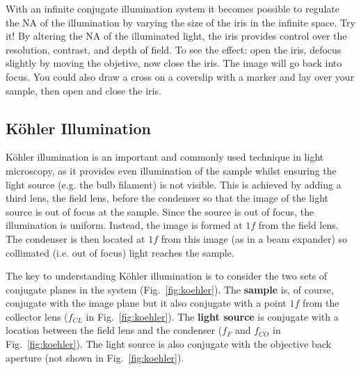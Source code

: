 \documentclass[a4paper]{report}
\begin{document}
With an infinite conjugate illumination system it becomes possible to regulate the NA of the illumination by varying the size of the iris in the infinite space. 
Try it!
By altering the NA of the illuminated light, the iris provides control over the resolution, contrast, and depth of field.
To see the effect: open the iris, defocus slightly by moving the objetive, now close the iris. The image will go back into focus. 
You could also draw a cross on a coverslip with a marker and lay over your sample, then open and close the iris.
%



\clearpage

\subsection{K\"{o}hler Illumination}
K\"{o}hler illumination is an important and commonly used technique in light microscopy, as it provides even illumination of the sample whilst ensuring the light source (e.g. the bulb filament) is not visible. 
This is achieved by adding a third lens, the field lens, before the condenser so that the image of the light source is out of focus at the sample. 
Since the source is out of focus, the illumination is uniform. 
Instead, the image is formed at $1f$ from the field lens. 
The condenser is then located at $1f$ from this image (as in a beam expander) so collimated (i.e. out of focus) light reaches the sample. 

The key to understanding K\"{o}hler illumination is to consider the two sets of conjugate planes in the system (Fig.~\ref{fig:koehler}). 
The \textbf{sample} is, of course, conjugate with the image plane but it also conjugate with a point $1f$ from the collector lens ($f_{CL}$ in Fig.~\ref{fig:koehler}). 
The \textbf{light source} is conjugate with a location between the field lens and the condenser ($f_F$ and $f_{CO}$ in Fig.~\ref{fig:koehler}). 
The light source is also conjugate with the objective back aperture (not shown in Fig.~\ref{fig:koehler}). 
\end{document}
